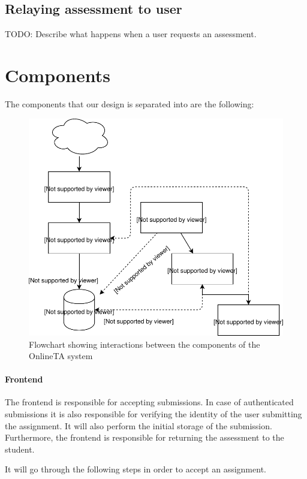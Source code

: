 \subsection{Relaying assessment to user}
TODO: Describe what happens when a user requests an assessment.

\section{Components}
The components that our design is separated into are the following:

\begin{figure}
\centering
\includegraphics[width=\textwidth]{figures/arch}
\caption{Flowchart showing interactions between the components of the
  OnlineTA system}
\label{fig:arch}
\end{figure}

\paragraph{Frontend}
The frontend is responsible for accepting submissions. In case of
authenticated submissions it is also responsible for verifying the
identity of the user submitting the assignment. It will also perform
the initial storage of the submission. Furthermore, the frontend is
responsible for returning the assessment to the student.

It will go through the following steps in order to accept an
assignment.

